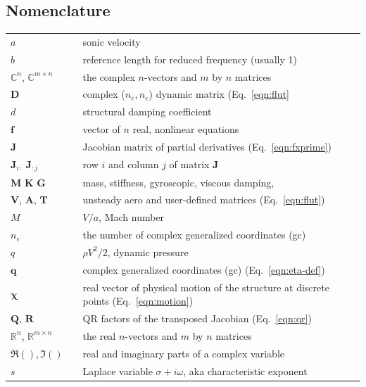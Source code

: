 \documentclass[11pt,openany,twoside]{book}
\numberwithin{equation}{section}		%
\newcommand{\Matrix}[1]{\boldsymbol{#1}}
\newcommand{\Vector}[1]{\boldsymbol{#1}}
\newcommand{\Gc}{gc}
\newcommand{\Eqn}[1]{Eq.\ \ref{#1}}  %
\begin{document}
\subsection{Nomenclature}\label{sect:nomenclature}
\noindent\begin{longtable}{@{}lcl@{}}
$a$ & & sonic velocity \\
$b$ & & reference length for reduced frequency (usually 1)\index{=b@$b$ (ref. length)} \\
$\mathbb{C}^n$, $\mathbb{C}^{m \times n}$ & & the complex $n$-vectors
   and $m$ by $n$ matrices \\
$\Matrix{D}$ & & complex ($n_e,n_e$) dynamic matrix (\Eqn{eqn:flut} \\
$d$ & & structural damping coefficient \\
$\Vector{f}$ & & vector of $n$ real, nonlinear equations \\
$\Matrix{J}$ & & Jacobian matrix of partial derivatives (\Eqn{eqn:fxprime}) \\
$\Matrix{J}_{i:}$\boldmath{,} $\Matrix{J}_{:j}$ & & row $i$
   and column $j$ of matrix $\Matrix{J}$ \\
$\Matrix{M}$\boldmath{,} $\Matrix{K}$\boldmath{,} $\Matrix{G}$\boldmath{,} &  & mass,
   stiffness, gyroscopic, viscous damping, \\
$\Matrix{V}$, $\Matrix{A}$, $\Matrix{T}$ & & unsteady aero and
   user-defined matrices (\Eqn{eqn:flut}) \\
$M$ & & $V/a$, Mach number \\
$n_e$ & & the number of complex generalized coordinates (\Gc) \\
$q$ & & $\rho V^2/2$, dynamic pressure \\
$\Vector{q}$ & & complex generalized coordinates (\Gc) (\Eqn{eqn:eta-def}) \\
$\Vector{\chi}$ & & real vector of physical motion of the structure
	at discrete points (\Eqn{eqn:motion}) \\
$\Matrix{Q}$, $\Matrix{R}$ & & QR factors of the transposed Jacobian (\Eqn{eqn:qr}) \\
$\mathbb{R}^n$, $\mathbb{R}^{m \times n}$ & & the real $n$-vectors and $m$ by $n$ matrices \\
$\Re(), \Im()$ & & real and imaginary parts of a complex variable \\
$s$ & & Laplace variable $\sigma + i\omega$, aka characteristic exponent \\

\end{longtable}
\end{document}
